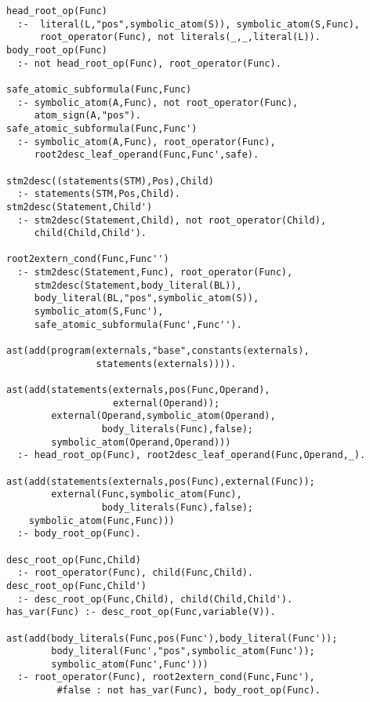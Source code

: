 \begin{center}
\begin{minipage}{\linewidth}
  \begin{lstlisting}[]
head_root_op(Func)
  :-  literal(L,"pos",symbolic_atom(S)), symbolic_atom(S,Func),
      root_operator(Func), not literals(_,_,literal(L)).
body_root_op(Func) 
  :- not head_root_op(Func), root_operator(Func).

safe_atomic_subformula(Func,Func) 
  :- symbolic_atom(A,Func), not root_operator(Func), 
     atom_sign(A,"pos").
safe_atomic_subformula(Func,Func')
  :- symbolic_atom(A,Func), root_operator(Func),
     root2desc_leaf_operand(Func,Func',safe).

stm2desc((statements(STM),Pos),Child) 
  :- statements(STM,Pos,Child).
stm2desc(Statement,Child') 
  :- stm2desc(Statement,Child), not root_operator(Child), 
     child(Child,Child').

root2extern_cond(Func,Func'')
  :- stm2desc(Statement,Func), root_operator(Func), 
     stm2desc(Statement,body_literal(BL)), 
     body_literal(BL,"pos",symbolic_atom(S)), 
     symbolic_atom(S,Func'), 
     safe_atomic_subformula(Func',Func'').

ast(add(program(externals,"base",constants(externals),
                statements(externals)))).

ast(add(statements(externals,pos(Func,Operand),
                   external(Operand));
        external(Operand,symbolic_atom(Operand),
                 body_literals(Func),false);
        symbolic_atom(Operand,Operand)))
  :- head_root_op(Func), root2desc_leaf_operand(Func,Operand,_).

ast(add(statements(externals,pos(Func),external(Func));
        external(Func,symbolic_atom(Func),
                 body_literals(Func),false);
	symbolic_atom(Func,Func)))
  :- body_root_op(Func).

desc_root_op(Func,Child) 
  :- root_operator(Func), child(Func,Child).
desc_root_op(Func,Child')
  :- desc_root_op(Func,Child), child(Child,Child').
has_var(Func) :- desc_root_op(Func,variable(V)).

ast(add(body_literals(Func,pos(Func'),body_literal(Func'));
        body_literal(Func',"pos",symbolic_atom(Func'));
        symbolic_atom(Func',Func')))
  :- root_operator(Func), root2extern_cond(Func,Func'), 
		 #false : not has_var(Func), body_root_op(Func).
\end{lstlisting}
\end{minipage}
\end{center}
